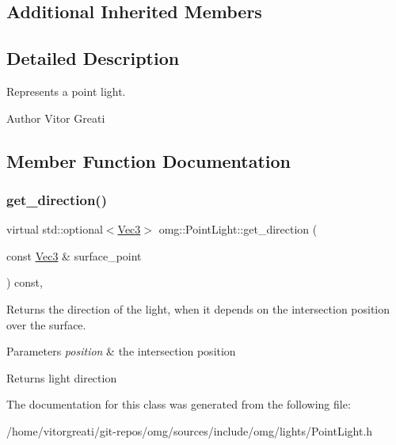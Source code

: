 \subsection*{Additional Inherited Members}


\subsection{Detailed Description}
Represents a point light. 

\begin{DoxyAuthor}{Author}
Vitor Greati 
\end{DoxyAuthor}


\subsection{Member Function Documentation}
\mbox{\label{classomg_1_1_point_light_a064ca776b8304a2733bbe20619e071be}} 
\subsubsection{\texorpdfstring{get\_direction()}{get\_direction()}}
{\footnotesize\ttfamily virtual std\+::optional$<$\mbox{\hyperlink{namespaceomg_a45a9482677fee9933ff369b49894e316}{Vec3}}$>$ omg\+::\+Point\+Light\+::get\+\_\+direction (\begin{DoxyParamCaption}\item[{const \mbox{\hyperlink{namespaceomg_a45a9482677fee9933ff369b49894e316}{Vec3}} \&}]{surface\+\_\+point }\end{DoxyParamCaption}) const\hspace{0.3cm}{\ttfamily [inline]}, {\ttfamily [virtual]}}



Returns the direction of the light, when it depends on the intersection position over the surface. 


\begin{DoxyParams}{Parameters}
{\em position} & the intersection position \\
\hline
\end{DoxyParams}
\begin{DoxyReturn}{Returns}
light direction 
\end{DoxyReturn}


The documentation for this class was generated from the following file\+:\begin{DoxyCompactItemize}
\item 
/home/vitorgreati/git-\/repos/omg/sources/include/omg/lights/Point\+Light.\+h\end{DoxyCompactItemize}
